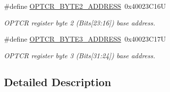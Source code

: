 \begin{DoxyCompactItemize}
\#define \hyperlink{group___f_l_a_s_h___private___constants_ga600e8029b876676da246a62924a294c7}{O\+P\+T\+C\+R\+\_\+\+B\+Y\+T\+E2\+\_\+\+A\+D\+D\+R\+E\+SS}~0x40023\+C16U
\begin{DoxyCompactList}\small\item\em O\+P\+T\+CR register byte 2 (Bits\mbox{[}23\+:16\mbox{]}) base address. \end{DoxyCompactList}\item 
\mbox{\label{group___f_l_a_s_h___private___constants_gab0cdb1b585010a65ca09ecf67055fb94}} 
\#define \hyperlink{group___f_l_a_s_h___private___constants_gab0cdb1b585010a65ca09ecf67055fb94}{O\+P\+T\+C\+R\+\_\+\+B\+Y\+T\+E3\+\_\+\+A\+D\+D\+R\+E\+SS}~0x40023\+C17U
\begin{DoxyCompactList}\small\item\em O\+P\+T\+CR register byte 3 (Bits\mbox{[}31\+:24\mbox{]}) base address. \end{DoxyCompactList}\end{DoxyCompactItemize}


\subsection{Detailed Description}
